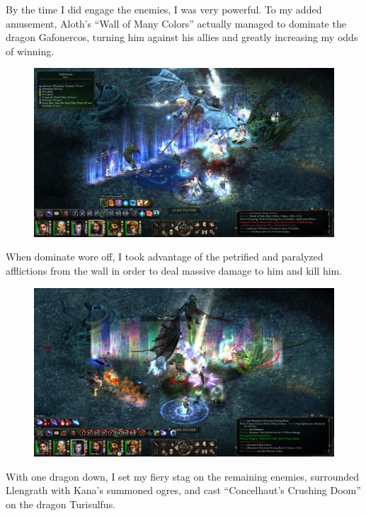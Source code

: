 \documentclass{article}
\begin{document}
By the time I did engage the enemies, I was very powerful.  To my added amusement, Aloth's ``Wall of Many Colors'' actually managed to dominate the dragon Gafonercos, turning him against his allies and greatly increasing my odds of winning.

\begin{figure}
\includegraphics[scale=0.33]{files/blog/2020_01_18_poe_potd_wmpt2/2020_01_18_llengrath3.jpg}
\end{figure}

When dominate wore off, I took advantage of the petrified and paralyzed afflictions from the wall in order to deal massive damage to him and kill him. 

\begin{figure}
\includegraphics[scale=0.33]{files/blog/2020_01_18_poe_potd_wmpt2/2020_01_18_llengrath4.jpg}
\end{figure}

With one dragon down, I set my fiery stag on the remaining enemies, surrounded Llengrath with Kana's summoned ogres, and cast ``Concelhaut's Crushing Doom'' on the dragon Turisulfus.
\end{document}

